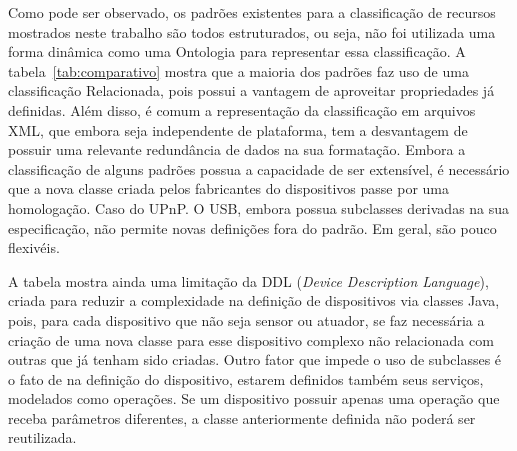 Como pode ser observado, os padrões existentes para a classificação de recursos mostrados neste trabalho são todos estruturados, ou seja, não foi utilizada uma forma dinâmica como uma Ontologia para representar essa classificação. A tabela~\ref{tab:comparativo} mostra que a maioria dos padrões faz uso de uma classificação Relacionada, pois possui a vantagem de aproveitar propriedades já definidas. Além disso, é comum a representação da classificação em arquivos XML, que embora seja independente de plataforma, tem a desvantagem de possuir uma relevante redundância de dados na sua formatação. Embora a classificação de alguns padrões possua a capacidade de ser extensível, é necessário que a nova classe criada pelos fabricantes do dispositivos passe por uma homologação. Caso do UPnP. O USB, embora possua subclasses derivadas na sua especificação, não permite novas definições fora do padrão. Em geral, são pouco flexivéis. 

A tabela mostra ainda uma limitação da DDL (\emph{Device Description Language}), criada para reduzir a complexidade na definição de dispositivos via classes Java, pois, para cada dispositivo que não seja sensor ou atuador, se faz necessária a criação de uma nova classe para esse dispositivo complexo não relacionada com outras que já tenham sido criadas. Outro fator que impede o uso de subclasses é o fato de na definição do dispositivo, estarem definidos também seus serviços, modelados como operações. Se um dispositivo possuir apenas uma operação que receba parâmetros diferentes, a classe anteriormente definida não poderá ser reutilizada. 

